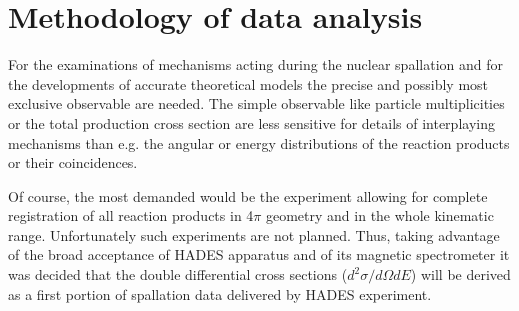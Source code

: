 


\section{Methodology of data analysis}

For the examinations of mechanisms acting during the nuclear spallation and for the developments of accurate theoretical models  
the precise and possibly most exclusive observable are needed.
The simple observable like particle multiplicities or the total production cross section are less sensitive for details 
of interplaying mechanisms than e.g. the angular or energy distributions of the reaction products or their coincidences.

Of course, the most demanded would be the experiment allowing for complete registration of all reaction products 
in 4$\pi$ geometry and in the whole kinematic range. Unfortunately such experiments are not planned. 
Thus, taking advantage of the broad acceptance of HADES apparatus and of its magnetic spectrometer 
it was decided that the double differential cross sections ($d^2\sigma/d\Omega dE$) will be derived as a 
first portion of spallation data delivered by HADES experiment. 



